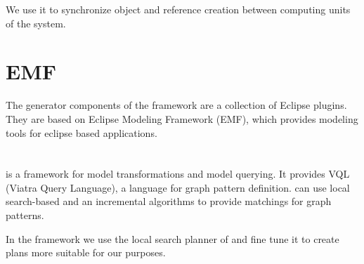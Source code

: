 We use it to synchronize object and reference creation between computing units of the system.


\section{EMF}
The generator components of the framework are a collection of Eclipse plugins.
They are based on Eclipse Modeling Framework (EMF), which provides modeling tools for eclipse based applications.


\section{\protect\viatra{} }


\viatra{} \cite{viatra} is a framework for model transformations and model querying. 
It provides VQL (Viatra Query Language), a language for graph pattern definition.
\viatra{} can use local search-based and an incremental algorithms to provide matchings for graph patterns. 

In the framework we use the local search planner of \viatra{} and fine tune it to create plans more suitable for our purposes.









